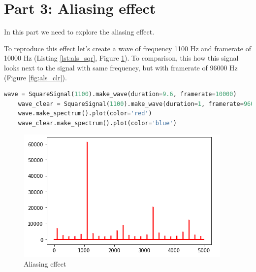 \documentclass[a4paper]{article}
\begin{document}
    \newpage
        \section{Part 3: Aliasing effect}
            
        In this part we need to explore the aliasing effect. 
        
        To reproduce this effect let's create a wave of frequency 1100 Hz and framerate of 10000 Hz (Listing \ref{lst:als_sqr}, Figure \ref{fig:als_sqr}). To comparison, this how this signal looks next to the signal with same frequency, but with framerate of 96000 Hz (Figure \ref{fig:als_clr}).
        
        
            
        \begin{lstlisting}[language=Python,caption=Waves creation,label={lst:als_sqr}]
    wave = SquareSignal(1100).make_wave(duration=9.6, framerate=10000)
    wave_clear = SquareSignal(1100).make_wave(duration=1, framerate=96000)
    wave.make_spectrum().plot(color='red')
    wave_clear.make_spectrum().plot(color='blue')
        \end{lstlisting}
            
        \begin{figure}[H]
            \centering
            \includegraphics[width=\textwidth]{img/als_bad.png}
            \caption{Aliasing effect}
            \label{fig:als_sqr}
        \end{figure}
        
\end{document}
